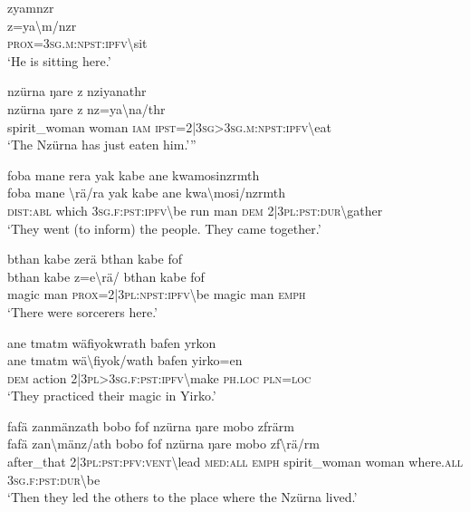 \ea\label{ex:8:a1819}
zyamnzr\\
\gll z=ya{\textbackslash}m/nzr\\
     \textsc{prox}=3\textsc{sg}.\textsc{m}:\textsc{npst}:\textsc{ipfv}{\textbackslash}sit\\
\glt `He is sitting here.'
\z

\ea\label{ex:8:a1820}
nzürna ŋare z nziyanathr\\
\gll nzürna	ŋare	z	nz=ya{\textbackslash}na/thr\\
     spirit\_woman	woman	\textsc{iam}	\textsc{ipst}=2|3\textsc{sg}>3\textsc{sg}.\textsc{m}:\textsc{npst}:\textsc{ipfv}{\textbackslash}eat\\
\glt `The Nzürna has just eaten him.'''
\z

\ea\label{ex:8:a1821}
foba mane rera yak kabe ane kwamosinzrmth\\
\gll foba	mane	{\textbackslash}rä/ra	yak	kabe	ane	kwa{\textbackslash}mosi/nzrmth\\
     \textsc{dist}:\textsc{abl}	which	3\textsc{sg}.\textsc{f}:\textsc{pst}:\textsc{ipfv}{\textbackslash}be	run	man	\textsc{dem}	2|3\textsc{pl}:\textsc{pst}:\textsc{dur}{\textbackslash}gather\\
\glt `They went (to inform) the people. They came together.'
\z

\ea\label{ex:8:a1824}
bthan kabe zerä bthan kabe fof\\
\gll bthan	kabe	z=e{\textbackslash}rä/	bthan	kabe	fof\\
     magic	man	\textsc{prox}=2|3\textsc{pl}:\textsc{npst}:\textsc{ipfv}{\textbackslash}be	magic	man	\textsc{emph}\\
\glt `There were sorcerers here.'
\z

\ea\label{ex:8:a1825}
ane tmatm wäfiyokwrath bafen yrkon\\
\gll ane	tmatm	wä{\textbackslash}fiyok/wath	bafen	yirko=en\\
     \textsc{dem}	action	2|3\textsc{pl}>3\textsc{sg}.\textsc{f}:\textsc{pst}:\textsc{ipfv}{\textbackslash}make	\textsc{ph}.\textsc{loc}	\textsc{pln}=\textsc{loc}\\
\glt `They practiced their magic in Yirko.'
\z

\ea\label{ex:8:a1827}
fafä zanmänzath bobo fof nzürna ŋare mobo zfrärm\\
\gll fafä	zan{\textbackslash}mänz/ath	bobo	fof	nzürna	ŋare	mobo	zf{\textbackslash}rä/rm\\
     after\_that	2|3\textsc{pl}:\textsc{pst}:\textsc{pfv}:\textsc{vent}{\textbackslash}lead	\textsc{med}:\textsc{all}	\textsc{emph}	spirit\_woman	woman	where.\textsc{all}	3\textsc{sg}.\textsc{f}:\textsc{pst}:\textsc{dur}{\textbackslash}be\\
\glt `Then they led the others to the place where the Nzürna lived.'
\z

